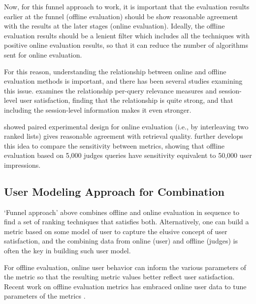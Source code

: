 Now, for this funnel approach to work, it is important that the evaluation results earlier at the funnel (offline evaluation) should be show reasonable agreement with the results at the later stages (online evaluation). Ideally, the offline evaluation results should be a lenient filter which includes all the techniques with positive online evaluation results, so that it can reduce the number of algorithms sent for online evaluation.

For this reason, understanding the relationship between online and offline evaluation methods is important, and there has been several studies examining this issue. \cite{Huffman:2007} examines the relationship per-query relevance measures and session-level user satisfaction, finding that the relationship is quite strong, and that including the session-level information makes it even stronger. 


\cite{Radlinski:2008} showed paired experimental design for online evaluation (i.e., by interleaving two ranked lists) gives reasonable agreement with retrieval quality. \cite{radl:comp10} further develops this idea to compare the sensitivity between metrics, showing that offline evaluation based on 5,000 judges queries have sensitivity equivalent to 50,000 user impressions.

\subsection{User Modeling Approach for Combination}

`Funnel approach' above combines offline and online evaluation in sequence to find a set of ranking techniques that satisfies both. Alternatively, one can build a metric based on some model of user to capture the elusive concept of user satisfaction, and the combining data from online (user) and offline (judges) is often the key in building such user model.

For offline evaluation, online user behavior can inform the various parameters of the metric so that the resulting metric values better reflect user satisfaction. Recent work on offline evaluation metrics has embraced online user data to tune parameters of the metrics \citep[for example]{CarteretteKY11, Carterette:2012,smucker12stochastic,YilmazSCR10}.

